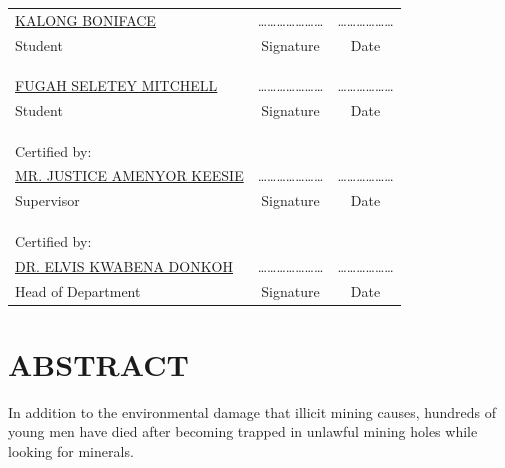 \documentclass[12pt,a4paper]{book}
\begin{document}
	\begin{center}
	\begin{tabular}{lcc}
		\underline{KALONG BONIFACE} &\quad\quad\quad \ldots\ldots\ldots\ldots\ldots\ldots\ldots &\quad\quad\quad \ldots\ldots\ldots\ldots\ldots\ldots \\
		Student &\quad\quad\quad Signature &\quad\quad\quad Date \\
		& & \\
		& & \\
		& & \\
		\underline{FUGAH SELETEY MITCHELL} &\quad\quad\quad \ldots\ldots\ldots\ldots\ldots\ldots\ldots &\quad\quad\quad \ldots\ldots\ldots\ldots\ldots\ldots \\
		Student &\quad\quad\quad Signature &\quad\quad\quad Date \\
		& & \\
		& & \\
		& & \\
		Certified by: & &\\
		\underline{MR. JUSTICE AMENYOR KEESIE} &\quad\quad\quad \ldots\ldots\ldots\ldots\ldots\ldots\ldots &\quad\quad\quad \ldots\ldots\ldots\ldots\ldots\ldots \\
		Supervisor &\quad\quad\quad Signature &\quad\quad\quad Date \\
		& & \\
		& & \\
		& & \\
		Certified by: & &\\
		\underline{DR. ELVIS KWABENA DONKOH} &\quad\quad\quad \ldots\ldots\ldots\ldots\ldots\ldots\ldots &\quad\quad\quad \ldots\ldots\ldots\ldots\ldots\ldots \\
		Head of Department &\quad\quad\quad Signature &\quad\quad\quad Date
	\end{tabular}
\end{center}
	
	
	\newpage
	\section*{\textbf{ABSTRACT}}
	In addition to the environmental damage that illicit mining causes, hundreds of young men have died after becoming trapped in unlawful mining holes while looking for minerals.
	
\end{document}
